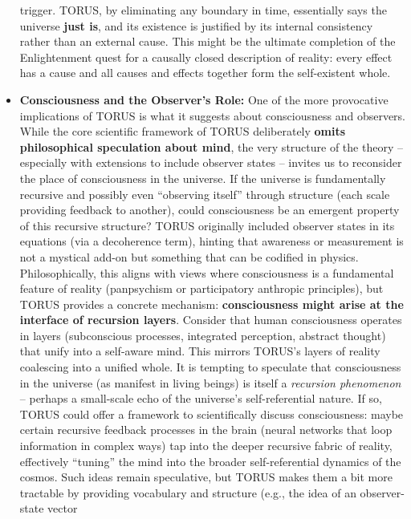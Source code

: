\documentclass[
]{article}
\begin{document}
\begin{itemize}
  trigger. TORUS, by eliminating any boundary in time, essentially says
  the universe \textbf{just is}, and its existence is justified by its
  internal consistency rather than an external cause. This might be the
  ultimate completion of the Enlightenment quest for a causally closed
  description of reality: every effect has a cause and all causes and
  effects together form the self-existent whole.
\item
  \textbf{Consciousness and the Observer's Role:} One of the more
  provocative implications of TORUS is what it suggests about
  consciousness and observers. While the core scientific framework of
  TORUS deliberately \textbf{omits philosophical speculation about
  mind}\hspace{0pt}, the very structure of the theory -- especially with
  extensions to include observer states -- invites us to reconsider the
  place of consciousness in the universe. If the universe is
  fundamentally recursive and possibly even ``observing itself'' through
  structure (each scale providing feedback to another), could
  consciousness be an emergent property of this recursive structure?
  TORUS originally included observer states in its equations (via a
  decoherence term)\hspace{0pt}, hinting that awareness or measurement
  is not a mystical add-on but something that can be codified in
  physics. Philosophically, this aligns with views where consciousness
  is a fundamental feature of reality (panpsychism or participatory
  anthropic principles), but TORUS provides a concrete mechanism:
  \textbf{consciousness might arise at the interface of recursion
  layers}. Consider that human consciousness operates in layers
  (subconscious processes, integrated perception, abstract thought) that
  unify into a self-aware mind. This mirrors TORUS's layers of reality
  coalescing into a unified whole. It is tempting to speculate that
  consciousness in the universe (as manifest in living beings) is itself
  a \emph{recursion phenomenon} -- perhaps a small-scale echo of the
  universe's self-referential nature. If so, TORUS could offer a
  framework to scientifically discuss consciousness: maybe certain
  recursive feedback processes in the brain (neural networks that loop
  information in complex ways) tap into the deeper recursive fabric of
  reality, effectively ``tuning'' the mind into the broader
  self-referential dynamics of the cosmos. Such ideas remain
  speculative, but TORUS makes them a bit more tractable by providing
  vocabulary and structure (e.g., the idea of an observer-state vector

\end{itemize}
\end{document}
